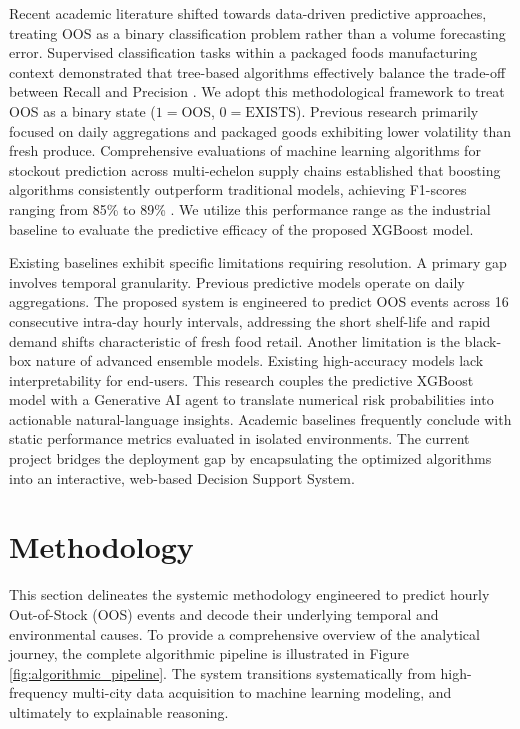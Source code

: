 \documentclass[11pt, a4paper]{article}
\begin{document}
Recent academic literature shifted towards data-driven predictive approaches, treating OOS as a binary classification problem rather than a volume forecasting error. Supervised classification tasks within a packaged foods manufacturing context demonstrated that tree-based algorithms effectively balance the trade-off between Recall and Precision \cite{andaur2021}. We adopt this methodological framework to treat OOS as a binary state ($1 = \text{OOS}$, $0 = \text{EXISTS}$). Previous research primarily focused on daily aggregations and packaged goods exhibiting lower volatility than fresh produce. Comprehensive evaluations of machine learning algorithms for stockout prediction across multi-echelon supply chains established that boosting algorithms consistently outperform traditional models, achieving F1-scores ranging from 85\% to 89\% \cite{shukla2022}. We utilize this performance range as the industrial baseline to evaluate the predictive efficacy of the proposed XGBoost model.

Existing baselines exhibit specific limitations requiring resolution. A primary gap involves temporal granularity. Previous predictive models operate on daily aggregations. The proposed system is engineered to predict OOS events across 16 consecutive intra-day hourly intervals, addressing the short shelf-life and rapid demand shifts characteristic of fresh food retail. Another limitation is the black-box nature of advanced ensemble models. Existing high-accuracy models lack interpretability for end-users. This research couples the predictive XGBoost model with a Generative AI agent to translate numerical risk probabilities into actionable natural-language insights. Academic baselines frequently conclude with static performance metrics evaluated in isolated environments. The current project bridges the deployment gap by encapsulating the optimized algorithms into an interactive, web-based Decision Support System.

\section{Methodology}

This section delineates the systemic methodology engineered to predict hourly Out-of-Stock (OOS) events and decode their underlying temporal and environmental causes. To provide a comprehensive overview of the analytical journey, the complete algorithmic pipeline is illustrated in Figure \ref{fig:algorithmic_pipeline}. The system transitions systematically from high-frequency multi-city data acquisition to machine learning modeling, and ultimately to explainable reasoning.
\end{document}
